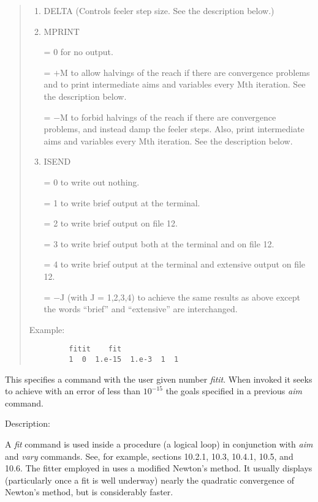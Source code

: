 \begin{quotation}
\begin{enumerate}
      \item  DELTA (Controls feeler step size.  See the description below.)

      \item  MPRINT

             = 0 for no output.

             = $+$M to allow halvings of the reach if there are convergence problems \hspace*{1em}and to print intermediate aims and variables every Mth iteration.  See the \hspace*{1em}description below.

             = $-$M to forbid halvings of the reach if there are convergence problems, and \hspace*{1em}instead damp the feeler steps.  Also, print intermediate aims and variables \hspace*{1em}every Mth iteration.  See the description below.

      \item  ISEND

		 = 0 to write out nothing.

		 = 1 to write brief output at the terminal.

		 = 2 to write brief output on file 12.

		 = 3 to write brief output both at the terminal and on file 12.

		 = 4 to write brief output at the terminal and extensive output on file
		   12.

		 = $-$J (with J = 1,2,3,4) to achieve the same results as above except
		   the \hspace*{1em}words ``brief'' and ``extensive'' are interchanged.
\end{enumerate}

\vspace{5mm}
\noindent Example:
\begin{verbatim}
         fitit    fit
         1  0  1.e-15  1.e-3  1  1
\end{verbatim}
\end{quotation}
This specifies a command with the user given number {\em fitit}.  When invoked it seeks to achieve with an error of less than $10^{-15}$ the goals specified in a previous {\em aim} command.

\vspace{5mm}
     Description:
\vspace{2mm}

A {\em fit} command is used inside a procedure (a logical loop) in conjunction with {\em aim} and {\em vary} commands.  See, for example, sections 10.2.1, 10.3, 10.4.1, 10.5, and 10.6.  The fitter employed in \Mary uses a modified Newton's method.  It usually displays (particularly once a fit is well underway) nearly the quadratic convergence of Newton's method, but is considerably faster.

